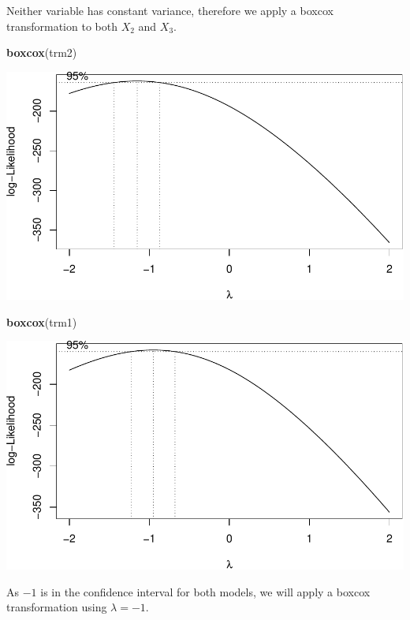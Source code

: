 \documentclass[]{article}
\newenvironment{Shaded}{\begin{snugshade}}{\end{snugshade}}
\newcommand{\KeywordTok}[1]{\textcolor[rgb]{0.13,0.29,0.53}{\textbf{#1}}}
\newcommand{\NormalTok}[1]{#1}
\begin{document}
Neither variable has constant variance, therefore we apply a boxcox
transformation to both \(X_{2}\) and \(X_{3}\).

\newpage

\begin{Shaded}
\begin{Highlighting}[]
\KeywordTok{boxcox}\NormalTok{(trm2)}
\end{Highlighting}
\end{Shaded}

\includegraphics{./figures/unnamed-chunk-24-1.pdf}

\begin{Shaded}
\begin{Highlighting}[]
\KeywordTok{boxcox}\NormalTok{(trm1)}
\end{Highlighting}
\end{Shaded}

\includegraphics{./figures/unnamed-chunk-25-1.pdf}

\newpage

As \(-1\) is in the confidence interval for both models, we will apply a
boxcox transformation using \(\lambda = -1\).
\end{document}
